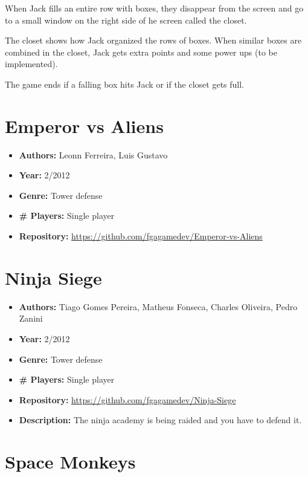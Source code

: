 \begin{apendicesenv}
\begin{itemize}
When Jack fills an entire row with boxes, they disappear from the screen and go to a small window on the right side of he screen called the closet.

The closet shows how Jack organized the rows of boxes. When similar boxes are combined in the closet, Jack gets extra points and some power ups (to be implemented).

The game ends if a falling box hits Jack or if the closet gets full.


\end{itemize}

\section{Emperor vs Aliens}
\label {sec:emperor}

\begin{itemize}
\item[] \textbf{Authors:} Leonn Ferreira, Luis Gustavo
\item[] \textbf{Year:} 2/2012
\item[] \textbf{Genre:} Tower defense
\item[] \textbf{\# Players:} Single player
\item[] \textbf{Repository:} \url{https://github.com/fgagamedev/Emperor-vs-Aliens}
\end{itemize}

\section{Ninja Siege}
\label {sec:ninja_siege}

\begin{itemize}
\item[] \textbf{Authors:} Tiago Gomes Pereira, Matheus Fonseca, Charles Oliveira, Pedro Zanini
\item[] \textbf{Year:} 2/2012
\item[] \textbf{Genre:} Tower defense
\item[] \textbf{\# Players:} Single player
\item[] \textbf{Repository:} \url{https://github.com/fgagamedev/Ninja-Siege}
\item[] \textbf{Description:} The ninja academy is being raided and you have to defend it.
\end{itemize}


\section{Space Monkeys}
\label {sec:space_monkey}


\end{apendicesenv}
